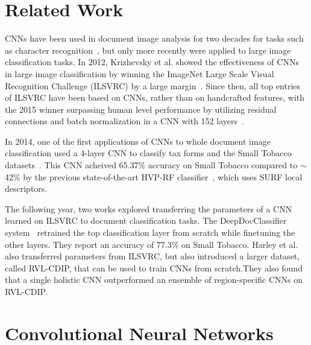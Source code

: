 \documentclass[10pt, conference, compsocconf]{IEEEtran}
\begin{document}
\section{Related Work}

CNNs have been used in document image analysis for two decades for tasks such as character recognition~\cite{lecun98,simard03}, but only more recently were applied to large image classification tasks.
In 2012, Krizhevsky et al. showed the effectiveness of CNNs in large image classification by winning the ImageNet Large Scale Visual Recognition Challenge (ILSVRC) by a large margin~\cite{krizhevsky12}.
Since then, all top entries of ILSVRC have been based on CNNs, rather than on handcrafted features, with the 2015 winner surpassing human level performance by utilizing residual connections and batch normalization in a CNN with 152 layers~\cite{he15residual}.

In 2014, one of the first applications of CNNs to whole document image classification used a 4-layer CNN to classify tax forms and the Small Tobacco datasets~\cite{kang14}.
This CNN acheived 65.37\% accuracy on Small Tobacco compared to $\sim$42\% by the previous state-of-the-art HVP-RF classifier~\cite{kumar13}, which uses SURF local descriptors.

The following year, two works explored transferring the parameters of a CNN learned on ILSVRC to document classification tasks.
The DeepDocClassifier system~\cite{afzal15} retrained the top classification layer from scratch while finetuning the other layers.
They report an accuracy of 77.3\% on Small Tobacco.
Harley et al.~\cite{harley15} also transferred parameters from ILSVRC, but also introduced a larger dataset, called RVL-CDIP, that can be used to train CNNs from scratch.They also found that a single holistic CNN outperformed an ensemble of region-specific CNNs on RVL-CDIP.

\section{Convolutional Neural Networks}
\end{document}
